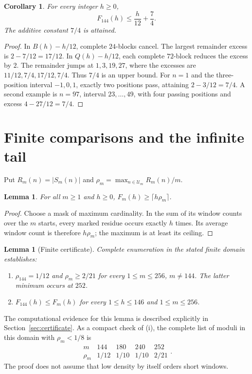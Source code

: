 \documentclass[11pt]{article}
\newtheorem{lemma}[theorem]{Lemma}
\newtheorem{corollary}[theorem]{Corollary}
\newcommand{\U}{\mathcal U}
\begin{document}
\begin{corollary}\label{cor:error}
For every integer $h\ge0$,
\[
                         F_{144}(h)\le\frac h{12}+\frac74.
\]
The additive constant $7/4$ is attained.
\end{corollary}
\begin{proof}
In $B(h)-h/12$, complete $24$-blocks cancel. The largest remainder excess
is $2-7/12=17/12$. In $Q(h)-h/12$, each complete $72$-block reduces the
excess by $2$. The remainder jumps at $1,3,19,27$, where the excesses are
$11/12,7/4,17/12,7/4$. Thus $7/4$ is an upper bound. For $n=1$ and the
three-position interval $-1,0,1$, exactly two positions pass, attaining
$2-3/12=7/4$. A second example is $n=97$, interval $23,\ldots,49$, with
four passing positions and excess $4-27/12=7/4$.
\end{proof}

\section{Finite comparisons and the infinite tail}

Put $R_m(n)=|S_m(n)|$ and $\rho_m=\max_{n\in\U_m}R_m(n)/m$.
\begin{lemma}\label{lem:average}
For all $m\ge1$ and $h\ge0$, $F_m(h)\ge\lceil h\rho_m\rceil$.
\end{lemma}
\begin{proof}
Choose a mask of maximum cardinality. In the sum of its window counts over
the $m$ starts, every marked residue occurs exactly $h$ times. Its average
window count is therefore $h\rho_m$; the maximum is at least its ceiling.
\end{proof}

\begin{lemma}[Finite certificate]\label{lem:finite}
Complete enumeration in the stated finite domain establishes:
\begin{enumerate}[label=(\roman*)]
\item $\rho_{144}=1/12$ and $\rho_m\ge2/21$ for every
      $1\le m\le256$, $m\ne144$. The latter minimum occurs at $252$.
\item $F_{144}(h)\le F_m(h)$ for every $1\le h\le146$ and
      $1\le m\le256$.
\end{enumerate}
\end{lemma}

The computational evidence for this lemma is described explicitly in
Section~\ref{sec:certificate}. As a compact check of (i), the complete list
of moduli in this domain with $\rho_m<1/8$ is
\[
\begin{array}{c|cccc}m&144&180&240&252\\\hline
\rho_m&1/12&1/10&1/10&2/21\end{array}.
\]
The proof does not assume that low density by itself orders short windows.
\end{document}
